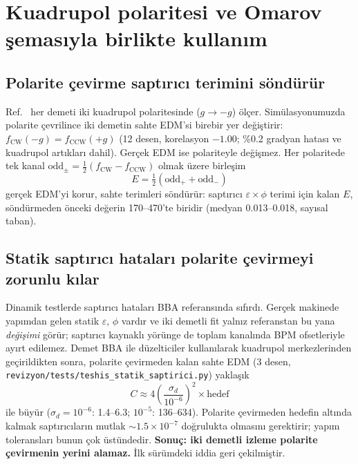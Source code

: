 \documentclass[12pt,a4paper]{extarticle}
\begin{document}
\section{Kuadrupol polaritesi ve Omarov şemasıyla birlikte kullanım}\label{sec:polarite}
\subsection{Polarite çevirme saptırıcı terimini söndürür}
Ref.~\cite{omarov} her demeti iki kuadrupol polaritesinde ($g\to-g$) ölçer. Simülasyonumuzda polarite
çevrilince iki demetin sahte EDM'si birebir yer değiştirir: $f_\text{CW}(-g)=f_\text{CCW}(+g)$ (12 desen,
korelasyon $-1.00$; \%0.2 gradyan hatası ve kuadrupol artıkları dahil). Gerçek EDM ise polariteyle değişmez.
Her polaritede tek kanal $\text{odd}_\pm=\frac12(f_\text{CW}-f_\text{CCW})$ olmak üzere birleşim
\begin{equation}
E=\tfrac12(\text{odd}_++\text{odd}_-)
\end{equation}
gerçek EDM'yi korur, sahte terimleri söndürür: saptırıcı $\varepsilon\times\phi$ terimi için kalan $E$,
söndürmeden önceki değerin 170--470'te biridir (medyan 0.013--0.018, sayısal taban).

\subsection{Statik saptırıcı hataları polarite çevirmeyi zorunlu kılar}
Dinamik testlerde saptırıcı hataları BBA referansında sıfırdı. Gerçek makinede yapımdan gelen statik
$\varepsilon$, $\phi$ vardır ve iki demetli fit yalnız referanstan bu yana \emph{değişimi} görür; saptırıcı
kaynaklı yörünge de toplam kanalında BPM ofsetleriyle ayırt edilemez. Demet BBA ile düzelticiler kullanılarak
kuadrupol merkezlerinden geçirildikten sonra, polarite çevirmeden kalan sahte EDM (3 desen,
\texttt{revizyon/tests/teshis\_statik\_saptirici.py}) yaklaşık
\begin{equation}
C\approx4\left(\frac{\sigma_d}{10^{-6}}\right)^2\times\text{hedef}
\end{equation}
ile büyür ($\sigma_d=10^{-6}$: 1.4--6.3; $10^{-5}$: 136--634). Polarite çevirmeden hedefin altında kalmak
saptırıcıların mutlak $\sim1.5\times10^{-7}$ doğrulukta olmasını gerektirir; yapım toleransları bunun çok
üstündedir. \textbf{Sonuç: iki demetli izleme polarite çevirmenin yerini alamaz.} İlk sürümdeki iddia geri
çekilmiştir.
\end{document}

